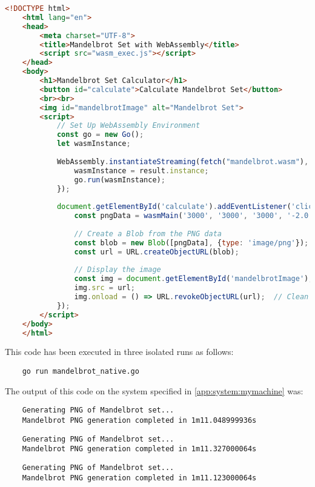\begin{lstlisting}[language=html, frame=tb, caption={Execute mandelbrot.wasm in Browser (HTML)}]
    <!DOCTYPE html>
    <html lang="en">
    <head>
        <meta charset="UTF-8">
        <title>Mandelbrot Set with WebAssembly</title>
        <script src="wasm_exec.js"></script>
    </head>
    <body>
        <h1>Mandelbrot Set Calculator</h1>
        <button id="calculate">Calculate Mandelbrot Set</button>
        <br><br>
        <img id="mandelbrotImage" alt="Mandelbrot Set">
        <script>                 
            // Set Up WebAssembly Environment
            const go = new Go();
            let wasmInstance;
    
            WebAssembly.instantiateStreaming(fetch("mandelbrot.wasm"), go.importObject).then((result) => {
                wasmInstance = result.instance;
                go.run(wasmInstance);
            });
    
            document.getElementById('calculate').addEventListener('click', () => {
                const pngData = wasmMain('3000', '3000', '3000', '-2.0', '1.0', '-1.5', '1.5');
                
                // Create a Blob from the PNG data
                const blob = new Blob([pngData], {type: 'image/png'});
                const url = URL.createObjectURL(blob);
                              
                // Display the image
                const img = document.getElementById('mandelbrotImage');
                img.src = url;
                img.onload = () => URL.revokeObjectURL(url);  // Clean up the object URL
            });
        </script>
    </body>
    </html>
\end{lstlisting}

This code has been executed in three isolated runs as follows:
\begin{lstlisting}
    go run mandelbrot_native.go
\end{lstlisting}

The output of this code on the system specified in \ref{app:system:mymachine} was:
\begin{lstlisting}
    Generating PNG of Mandelbrot set... 
    Mandelbrot PNG generation completed in 1m11.048999936s
\end{lstlisting}
\begin{lstlisting}
    Generating PNG of Mandelbrot set... 
    Mandelbrot PNG generation completed in 1m11.327000064s
\end{lstlisting}
\begin{lstlisting}
    Generating PNG of Mandelbrot set... 
    Mandelbrot PNG generation completed in 1m11.123000064s
\end{lstlisting}

